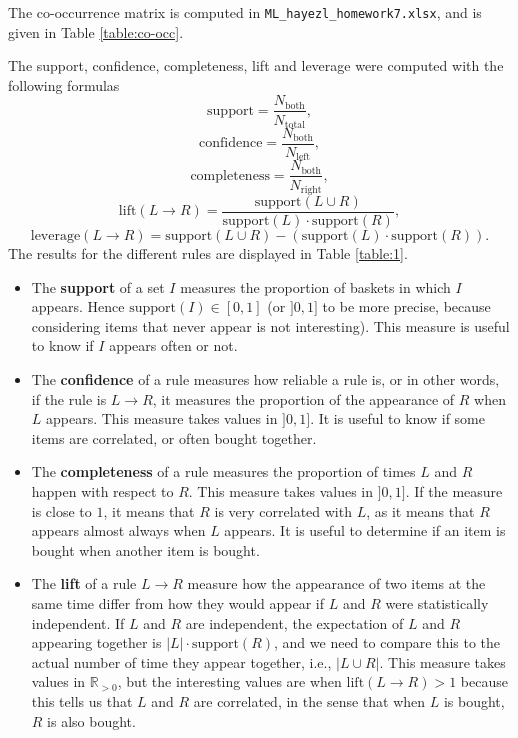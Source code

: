 \documentclass[fontsize=12pt, usenames, dvipsnames, headinclude, headsepline, footinclude, footsepline]{scrartcl}
\newcommand{\R}{\mathbb{R}}
\renewcommand{\emph}{\textbf}
\begin{document}
  \begin{sol}
    The co-occurrence matrix is computed in \texttt{ML\_hayezl\_homework7.xlsx}, and is
    given in Table \ref{table:co-occ}. 

    The support, confidence, completeness, lift and leverage were computed with the following formulas 
    \[ \mathrm{support} = \frac{N_{\mathrm{both}}}{N_{\mathrm{total}}},\] 
    \[ \mathrm{confidence} = \frac{N_{\mathrm{both}}}{N_{\mathrm{left}}}, \] 
    \[ \mathrm{completeness} = \frac{N_{\mathrm{both}}}{N_{\mathrm{right}}}, \] 
    \[ \mathrm{lift}(L \to R) = \frac{\mathrm{support}(L \cup R)}{\mathrm{support}(L) \cdot
        \mathrm{support}(R)},  \] 
    \[ \mathrm{leverage}(L \to R) =  \mathrm{support}(L \cup R) - (\mathrm{support}(L) \cdot
      \mathrm{support}(R)).\]
    The results for the different rules are displayed in Table \ref{table:1}.

    \begin{itemize}
    \item The \emph{support} of a set $I$ measures the proportion of baskets in which $I$ appears. Hence
      $\mathrm{support}(I) \in [0, 1]$ (or $]0, 1]$ to be more precise, because considering items that never
      appear is not interesting). This measure is useful to know if $I$ appears often or not.

    \item The \emph{confidence} of a rule measures how reliable a rule is, or in other words, if the rule is
      $L \to R$, it measures the proportion of the appearance of $R$ when $L$ appears. This measure takes
      values in $]0,1]$. It is useful to know if some items are correlated, or often bought together. 

    \item The \emph{completeness} of a rule measures the proportion of times $L$ and $R$ happen with respect
      to $R$. This measure takes values in $]0,1]$. If the measure is close to $1$, it means that $R$ is very
      correlated with $L$, as it means that $R$ appears almost always when $L$ appears. It is useful to
      determine if an item is bought when another item is bought.

    \item The \emph{lift} of a rule $L \to R$ measure how the appearance of two items at the same time differ
      from how they would appear if $L$ and $R$ were statistically independent. If $L$ and $R$ are
      independent, the expectation of $L$ and $R$ appearing together is $|L| \cdot \mathrm{support}(R)$, and
      we need to compare this to the actual number of time they appear together, i.e., $|L \cup R|$. This
      measure takes values in $\R_{>0}$, but the interesting values are when $\mathrm{lift}(L \to R) > 1$
      because this tells us that $L$ and $R$ are correlated, in the sense that when $L$ is bought, $R$ is also
      bought. 


\end{itemize}
\end{sol}
\end{document}
